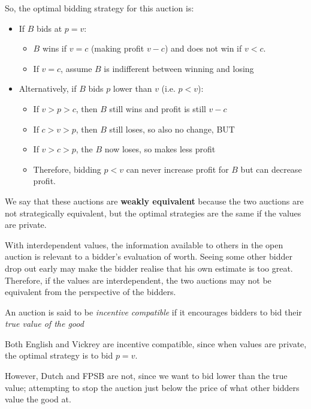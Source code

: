\documentclass[11pt,a4paper,titlepage,dvipsnames,cmyk]{scrartcl}
\begin{document}
So, the optimal bidding strategy for this auction is:
\begin{itemize}
    \item If $B$ bids at $p = v$:
    \begin{itemize}
        \item $B$ wins if $v = c$ (making profit $v-c$) and does not win if $v < c$.
        \item If $v=c$, assume $B$ is indifferent between winning and losing
    \end{itemize}
    \item Alternatively, if $B$ bids $p$ lower than $v$ (i.e. $p<v$):
    \begin{itemize}
        \item If $v > p > c$, then $B$ still wins and profit is still $v-c$
        \item If $c > v > p$, then $B$ still loses, so also no change, BUT
        \item If $v > c > p$, the $B$ now loses, so makes less profit
        \item Therefore, bidding $p < v$ can never increase profit for $B$ but can decrease profit.
    \end{itemize}
\end{itemize}

We say that these auctions are \textbf{weakly equivalent} because the two auctions are not strategically equivalent, but the optimal strategies are the same if the values are private.

With interdependent values, the information available to others in the open auction is relevant to a bidder's evaluation of worth. Seeing some other bidder drop out early may make the bidder realise that his own estimate is too great. Therefore, if the values are interdependent, the two auctions may not be equivalent from the perspective of the bidders.

\begin{tcolorbox}
\begin{center}
    An auction is said to be \textit{incentive compatible} if it encourages bidders to bid their \textit{true value of the good}
\end{center}
\end{tcolorbox}

Both English and Vickrey are incentive compatible, since when values are private, the optimal strategy is to bid $p = v$.

However, Dutch and FPSB are not, since we want to bid lower than the true value; attempting to stop the auction just below the price of what other bidders value the good at.
\end{document}
